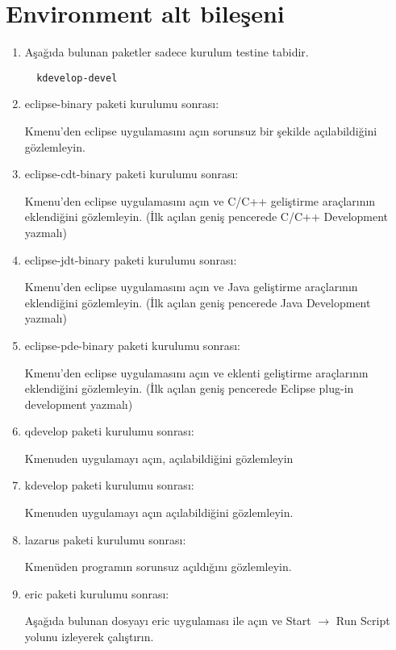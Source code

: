 \documentclass[a4paper,10pt]{article}
\begin{document}
\section{Environment alt bileşeni}
\begin{enumerate}

\item Aşağıda bulunan paketler sadece kurulum testine tabidir.

 \begin{verbatim}
  kdevelop-devel
 \end{verbatim}

\item eclipse-binary paketi kurulumu sonrası:

Kmenu'den eclipse uygulamasını açın sorunsuz bir şekilde açılabildiğini gözlemleyin.

\item eclipse-cdt-binary paketi kurulumu sonrası:

Kmenu'den eclipse uygulamasını açın ve C/C++ geliştirme araçlarının eklendiğini gözlemleyin. (İlk açılan geniş pencerede C/C++ Development yazmalı)

\item eclipse-jdt-binary paketi kurulumu sonrası:

Kmenu'den eclipse uygulamasını açın ve Java geliştirme araçlarının eklendiğini gözlemleyin. (İlk açılan geniş pencerede Java Development yazmalı)

\item eclipse-pde-binary paketi kurulumu sonrası:

Kmenu'den eclipse uygulamasını açın ve eklenti geliştirme araçlarının eklendiğini gözlemleyin. (İlk açılan geniş pencerede Eclipse plug-in development yazmalı)

\item qdevelop paketi kurulumu sonrası:

Kmenuden uygulamayı açın, açılabildiğini gözlemleyin

 \item kdevelop paketi kurulumu sonrası: 

Kmenuden uygulamayı açın açılabildiğini gözlemleyin.

 \item lazarus paketi kurulumu sonrası:

Kmenüden programın sorunsuz açıldığını gözlemleyin.

 \item eric paketi kurulumu sonrası:
 
Aşağıda bulunan dosyayı eric uygulaması ile açın ve Start $\rightarrow$ Run Script yolunu izleyerek çalıştırın. 


\end{enumerate}
\end{document}
